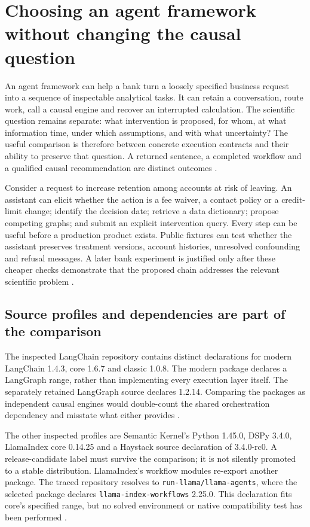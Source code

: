 \section{Choosing an agent framework without changing the causal question}
\label{sec:exec24-framework-census}

An agent framework can help a bank turn a loosely specified business request
into a sequence of inspectable analytical tasks. It can retain a conversation,
route work, call a causal engine and recover an interrupted calculation. The
scientific question remains separate: what intervention is proposed, for whom,
at what information time, under which assumptions, and with what uncertainty?
The useful comparison is therefore between concrete execution contracts and
their ability to preserve that question. A returned sentence, a completed
workflow and a qualified causal recommendation are distinct outcomes
\cite{exec24_framework_contracts}.

Consider a request to increase retention among accounts at risk of leaving.
An assistant can elicit whether the action is a fee waiver, a contact policy
or a credit-limit change; identify the decision date; retrieve a data
dictionary; propose competing graphs; and submit an explicit intervention
query. Every step can be useful before a production product exists. Public
fixtures can test whether the assistant preserves treatment versions,
account histories, unresolved confounding and refusal messages. A later
bank experiment is justified only after these cheaper checks demonstrate
that the proposed chain addresses the relevant scientific problem
\cite{exec24_framework_contracts}.

\subsection{Source profiles and dependencies are part of the comparison}
The inspected LangChain repository contains distinct declarations for
modern LangChain 1.4.3, core 1.6.7 and classic 1.0.8. The modern package
declares a LangGraph range, rather than implementing every execution layer
itself. The separately retained LangGraph source declares 1.2.14.
Comparing the packages as independent causal engines would double-count
the shared orchestration dependency and misstate what either provides
\cite{exec24_framework_langchain,v12_la04_langgraph}.

The other inspected profiles are Semantic Kernel's Python 1.45.0,
DSPy 3.4.0, LlamaIndex core 0.14.25 and a Haystack source declaration of
3.4.0-rc0. A release-candidate label must survive the comparison; it is
not silently promoted to a stable distribution. LlamaIndex's workflow
modules re-export another package. The traced repository resolves to
\texttt{run-llama/llama-agents}, where the selected package declares
\texttt{llama-index-workflows} 2.25.0. This declaration fits core's
specified range, but no solved environment or native compatibility test
has been performed
\cite{exec24_framework_semantic_kernel,exec24_framework_dspy,
exec24_framework_llama_index,exec24_framework_haystack,
exec24_framework_workflows}.

